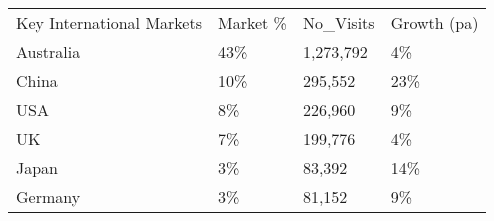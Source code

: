 \begin{tabular}[t]{p{3.5cm}p{1.1cm}p{1.3cm}p{1.2cm}}
 Key International Markets & Market \% & No\_Visits & Growth (pa) \\ 
 Australia & 43\% & 1,273,792 & 4\% \\ 
  China & 10\% &   295,552 & 23\% \\ 
  USA & 8\% &   226,960 & 9\% \\ 
  UK & 7\% &   199,776 & 4\% \\ 
  Japan & 3\% &    83,392 & 14\% \\ 
  Germany & 3\% &    81,152 & 9\% \\ 
  \end{tabular}
